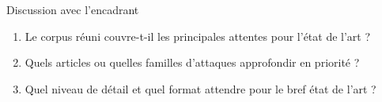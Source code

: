 \documentclass[aspectratio=169,11pt]{beamer}
\begin{document}
\begin{frame}{Discussion avec l'encadrant}
  \begin{enumerate}
    \setlength{\itemsep}{1em}
    \item Le corpus réuni couvre-t-il les principales attentes pour l'état de l'art ?
    \item Quels articles ou quelles familles d'attaques approfondir en priorité ?
    \item Quel niveau de détail et quel format attendre pour le bref état de l'art ?
  \end{enumerate}
\end{frame}
\end{document}
